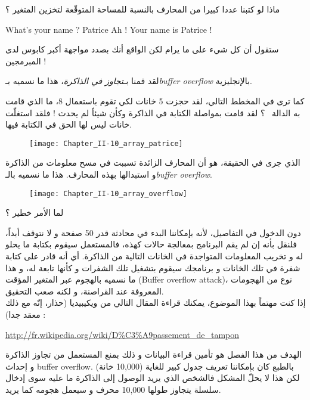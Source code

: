 ماذا لو كتبنا عددا كبيرا من المحارف بالنسبة للمساحة المتوقّعة لتخزين المتغير ؟

\begin{Console}
What's your name ? Patrice
Ah ! Your name is Patrice !
\end{Console}

ستقول أن كل شيء على ما يرام لكن الواقع أنك بصدد مواجهة أكبر كابوس لدى المبرمجين !

لقد قمنا بـ\emph{تجاوز في الذاكرة}،
 هذا ما نسميه بـ\emph{\textenglish{buffer overflow}}
بالإنجليزية.

كما ترى في المخطط التالي، لقد حجزت 5 خانات لكي تقوم باستعمال 8، ما الذي قامت به الدالة
~؟
 لقد قامت بمواصلة الكتابة في الذاكرة وكأن شيئاً لم يحدث ! فلقد استغلّت خانات ليس لها الحق في الكتابة فيها.

\begin{figure}[H]
	\centering
	\texttt{[image: Chapter\_II-10\_array\_patrice]}
\end{figure}

الذي جرى في الحقيقة، هو أن المحارف الزائدة تسببت في مسح معلومات من الذاكرة و استبدالها بهذه المحارف. هذا ما نسميه بالـ\emph{\textenglish{buffer overflow}}.

\begin{figure}[H]
	\centering
	\texttt{[image: Chapter\_II-10\_array\_overflow]}
\end{figure}

\begin{question}
  لما الأمر خطير ؟
\end{question}

دون الدخول في التفاصيل، لأنه بإمكاننا البدء في محادثة  قدر 50 صفحة و لا نتوقف أبداً، فلنقل بأنه إن لم يقم البرنامج بمعالجة حالات كهذه، فالمستعمل سيقوم بكتابة ما يحلو له و تخريب المعلومات المتواجدة في الخانات التالية من الذاكرة. أي أنه قادر على كتابة شفرة في تلك الخانات و برنامجك سيقوم بتشغيل تلك الشفرات و كأنها تابعة له، و هذا ما نسميه بالهجوم عبر المتغير المؤقت
(\textenglish{Buffer overflow attack})،
نوع من الهجومات المعروفة عند القراصنة، و لكنه صعب التحقيق.\\
إذا كنت مهتماً بهذا الموضوع، يمكنك قراءة المقال التالي من ويكيبيديا (حذار، إنّه مع ذلك معقد جدا) :

\url{http://fr.wikipedia.org/wiki/D%C3%A9passement_de_tampon}

الهدف من هذا الفصل هو تأمين قراءة البيانات و ذلك بمنع المستعمل من تجاوز الذاكرة و إحداث
\textenglish{buffer overflow}.
بالطبع كان بإمكاننا تعريف جدول كبير للغاية (10,000 خانة) لكن هذا لا يحلّ المشكل فالشخص الذي يريد الوصول إلى الذاكرة ما عليه سوى إدخال سلسلة يتجاوز طولها 10,000 محرف و سيعمل هجومه كما يريد.

